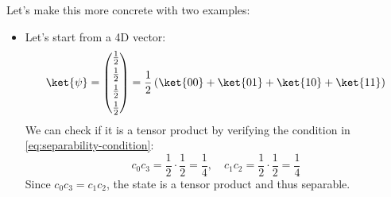 \highspace
Let's make this more concrete with two examples:
\begin{itemize}
    \item[\textcolor{Green3}{\faIcon{check}}] Let's start from a 4D vector:
    \begin{equation*}
        \ket{\psi} = \begin{pmatrix}
            \frac{1}{2} \\[.3em]
            \frac{1}{2} \\[.3em]
            \frac{1}{2} \\[.3em]
            \frac{1}{2}
        \end{pmatrix}
        = \frac{1}{2} \left( \ket{00} + \ket{01} + \ket{10} + \ket{11} \right)
    \end{equation*}
    We can check if it is a tensor product by verifying the condition in \autoref{eq:separability-condition}:
    \begin{equation*}
        c_{0}c_{3} = \frac{1}{2} \cdot \frac{1}{2} = \frac{1}{4}, \quad c_{1}c_{2} = \frac{1}{2} \cdot \frac{1}{2} = \frac{1}{4}
    \end{equation*}
    Since $c_{0}c_{3} = c_{1}c_{2}$, the state is a tensor product and thus separable.
    

\end{itemize}

